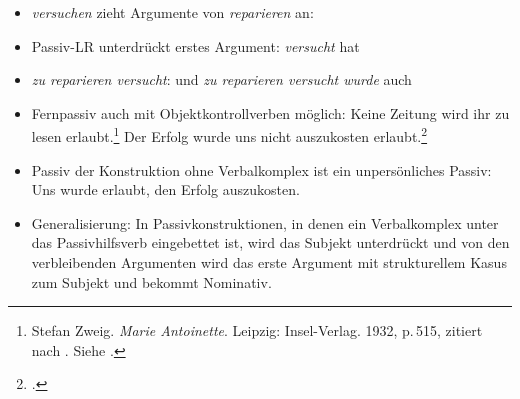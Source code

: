 \centerline{}

\begin{itemize}
\item \emph{versuchen} zieht Argumente von \emph{reparieren} an: \argstw {}

\item Passiv-LR unterdrückt erstes Argument: \emph{versucht} hat
\argstw {} 

\item \emph{zu reparieren versucht}: \argstw {} und
\emph{zu reparieren versucht wurde} auch
\end{itemize}





\begin{itemize}
\item Fernpassiv auch mit Objektkontrollverben möglich:
\eal
\ex
Keine Zeitung         wird ihr       zu lesen erlaubt.\footnote{
        Stefan Zweig. \emph{Marie Antoinette}. Leipzig: Insel-Verlag. 1932, p.\,515, 
        zitiert nach . Siehe \citet[]{Askedal88}.
}
\ex{}
Der Erfolg        wurde uns      nicht auszukosten erlaubt.\footnote{
        .%
}
\zl


\item Passiv der Konstruktion ohne Verbalkomplex ist ein unpersönliches Passiv:
\eas
Uns wurde erlaubt, den Erfolg auszukosten.
\zs

\item Generalisierung: In Passivkonstruktionen, in denen ein Verbalkomplex unter das Passivhilfsverb
eingebettet ist, wird das Subjekt unterdrückt und von den verbleibenden Argumenten
wird das erste Argument mit strukturellem Kasus zum Subjekt und bekommt Nominativ.%
\end{itemize}


